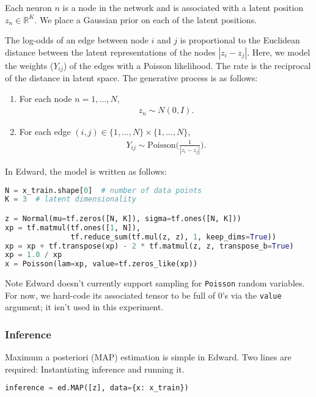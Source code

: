 Each neuron $n$ is a node in the network and is associated with a latent
position $z_n\in\mathbb{R}^K$.
We place a Gaussian prior on each of the latent positions.

The log-odds of an edge between node $i$ and
$j$ is proportional to the Euclidean distance between the latent
representations of the nodes $|z_i- z_j|$. Here, we
model the weights ($Y_{ij}$) of the edges with a Poisson likelihood.
The rate is the reciprocal of the distance in latent space. The
generative process is as follows:

\begin{enumerate}
\item
For each node $n=1,\ldots,N$,
\begin{align}
z_n \sim N(0,I).
\end{align}
\item
For each edge $(i,j)\in\{1,\ldots,N\}\times\{1,\ldots,N\}$,
\begin{align}
Y_{ij} \sim \text{Poisson}\Bigg(\frac{1}{|z_i - z_j|}\Bigg).
\end{align}
\end{enumerate}

In Edward, the model is written as follows:
\begin{lstlisting}[language=Python]
N = x_train.shape[0]  # number of data points
K = 3  # latent dimensionality

z = Normal(mu=tf.zeros([N, K]), sigma=tf.ones([N, K]))
xp = tf.matmul(tf.ones([1, N]),
               tf.reduce_sum(tf.mul(z, z), 1, keep_dims=True))
xp = xp + tf.transpose(xp) - 2 * tf.matmul(z, z, transpose_b=True)
xp = 1.0 / xp
x = Poisson(lam=xp, value=tf.zeros_like(xp))
\end{lstlisting}

Note Edward doesn't currently support sampling for \texttt{Poisson}
random variables. For now, we hard-code its associated tensor to be
full of 0's via the \texttt{value} argument; it isn't used in this
experiment.

\subsubsection{Inference}

Maximum a posteriori (MAP) estimation is simple in Edward. Two lines are
required: Instantiating inference and running it.
\begin{lstlisting}[language=Python]
inference = ed.MAP([z], data={x: x_train})
\end{lstlisting}

